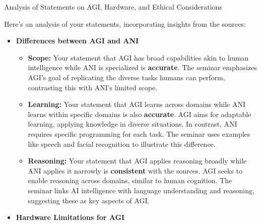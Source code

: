 \documentclass[
]{article}
\author{}
\date{}
\begin{document}
{Analysis of Statements on AGI, Hardware, and Ethical
Considerations}\label{analysis-of-statements-on-agi-hardware-and-ethical-considerations}

Here's an analysis of your statements, incorporating insights from the
sources:

\begin{itemize}
\item
  \textbf{Differences between AGI and ANI}

  \begin{itemize}
  
  \item
    \textbf{Scope:} Your statement that AGI has broad capabilities akin
    to human intelligence while ANI is specialized is \textbf{accurate}.
    The seminar emphasizes AGI's goal of replicating the diverse tasks
    humans can perform, contrasting this with ANI's limited scope.
  \item
    \textbf{Learning:} Your statement that AGI learns across domains
    while ANI learns within specific domains is also \textbf{accurate}.
    AGI aims for adaptable learning, applying knowledge in diverse
    situations. In contrast, ANI requires specific programming for each
    task. The seminar uses examples like speech and facial recognition
    to illustrate this difference.
  \item
    \textbf{Reasoning:} Your statement that AGI applies reasoning
    broadly while ANI applies it narrowly is \textbf{consistent} with
    the sources. AGI seeks to enable reasoning across domains, similar
    to human cognition. The seminar links AI intelligence with language
    understanding and reasoning, suggesting these as key aspects of AGI.
  \end{itemize}
\item
  \textbf{Hardware Limitations for AGI}

  \begin{itemize}
  

\end{itemize}
\end{itemize}
\end{document}
